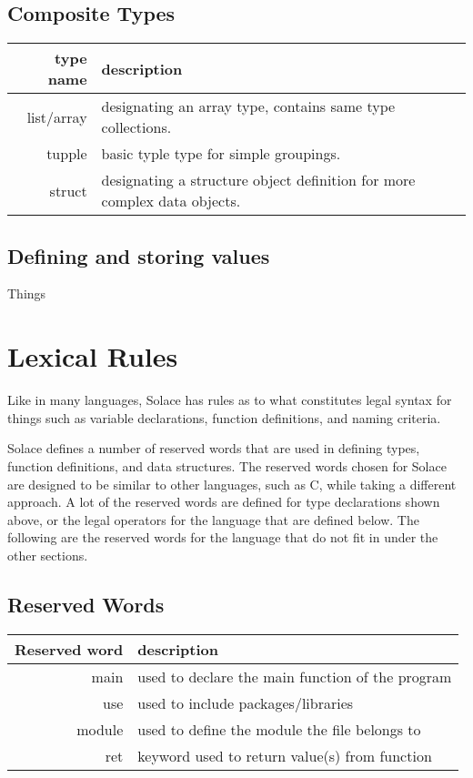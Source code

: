 \documentclass{article}
\begin{document}
\subsection{Composite Types}
\begin{center}
\begin{tabular}{|r|l|}
	\hline
	type name & description \\
	\hline
	\hline
	list/array & designating an array type, contains same type collections. \\
	tupple & basic typle type for simple groupings. \\
	struct & designating a structure object definition for more complex data objects. \\
	\hline
\end{tabular}
\end{center}

\subsection{Defining and storing values}
Things


\section{Lexical Rules}
Like in many languages, Solace has rules as to what constitutes legal syntax for things such as
variable declarations, function definitions, and naming criteria.

Solace defines a number of reserved words that are used in defining types, function definitions,
and data structures. The reserved words chosen for Solace are designed to be similar to
other languages, such as C, while taking a different approach. A lot of the
reserved words are defined for type declarations shown above, or the legal operators for the 
language that are defined below. The following are the reserved words for the language
that do not fit in under the other sections.


\subsection{Reserved Words}

\begin{center}
\begin{tabular}{|r|l|}
\hline
Reserved word & description \\
\hline
\hline
main & used to declare the main function of the program \\
use & used to include packages/libraries \\
module & used to define the module the file belongs to \\
ret & keyword used to return value(s) from function \\
\hline
\end{tabular}
\end{center}
\end{document}

